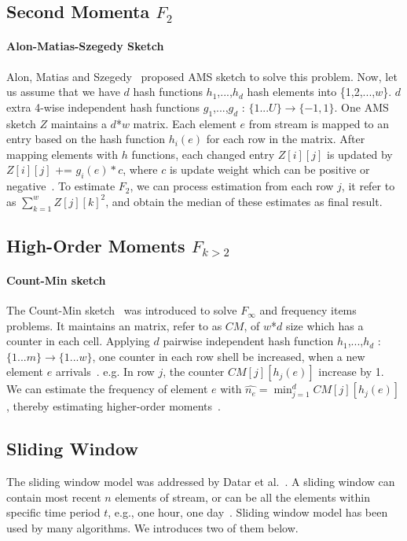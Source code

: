 \subsection{Second Momenta $F_2$}
\paragraph{Alon-Matias-Szegedy Sketch}
Alon, Matias and Szegedy~\cite{alon1999space} proposed AMS sketch to solve this
problem. Now, let us assume that we have $d$ hash functions $h_1$,...,$h_d$ hash
elements into \{1,2,...,$w$\}. $d$ extra 4-wise independent hash functions
$g_1$,...,$g_d$ : $\{1...U\}\rightarrow \{-1,1\}$. One AMS sketch $Z$ maintains a
$d$*$w$ matrix. Each element $e$ from stream is mapped to an entry based on the
hash function $h_i(e)$ for each row in the matrix. After mapping elements with
$h$ functions, each changed entry $Z[i][j]$ is updated by $Z[i][j]$ +=
$g_i(e)*c$, where $c$ is update weight which can be positive or negative~\cite{garofalakis2016data}. To estimate $F_2$, we
can process estimation from each row $j$, it refer to as $\sum_{k=1}^w Z[j][k]^2$,
and obtain the median of these estimates as final result.

\subsection{High-Order Moments $F_{k>2}$}
\paragraph{Count-Min sketch}
The Count-Min sketch~\cite{cormode2005improved} was introduced to solve
$F_\infty$ and frequency items problems. It maintains an matrix, refer to as
$CM$, of $w$*$d$ size which has a counter in each cell. Applying $d$ pairwise
independent hash function $h_1$,...,$h_d$ : $\{1...m\} \rightarrow \{1...w\}$,
one counter in each row shell be increased, when a new element $e$ arrivals~\cite{garofalakis2016data}.
e.g. In row $j$, the counter $CM[j][h_j(e)]$ increase by 1. We can estimate the
frequency of element $e$ with $\hat{n_e} = \min_{j=1}^d CM[j][h_j(e)]$, thereby
estimating higher-order moments~\cite{cormode2005improved}.


\subsection{Sliding Window}
The sliding window model was addressed by Datar et al.~\cite{datar2002maintaining}. A sliding window can contain most recent $n$
elements of stream, or can be all the elements within specific time period $t$,
e.g., one hour, one day~\cite{leskovec2014mining}. Sliding window model has been
used by many algorithms. We introduces two of them below.

